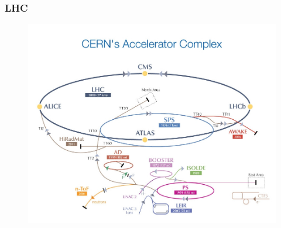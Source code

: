 \documentclass[11pt]{beamer}
\begin{document}
\begin{frame}
\frametitle{LHC}
	\begin{figure}
		\centering
	\includegraphics[scale=0.2]{figures/CERN's-accelerator-complex2013.jpg}
	\end{figure}
\end{frame}
\end{document}
